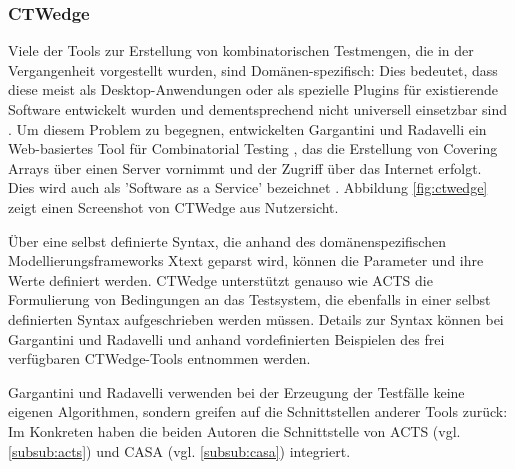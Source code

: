 \subsubsection{CTWedge}\label{subsub:ctwedge}

Viele der Tools zur Erstellung von kombinatorischen Testmengen, die in der Vergangenheit vorgestellt wurden, sind Domänen-spezifisch: Dies bedeutet, dass diese meist als Desktop-Anwendungen oder als spezielle Plugins für existierende Software entwickelt wurden und dementsprechend nicht universell einsetzbar sind \cite{gargantini2018migrating}. Um diesem Problem zu begegnen, entwickelten Gargantini und Radavelli \cite{gargantini2018migrating} ein Web-basiertes Tool für Combinatorial Testing \cite{ctwedge}, das die Erstellung von Covering Arrays über einen Server vornimmt und der Zugriff über das Internet erfolgt. Dies wird auch als 'Software as a Service' bezeichnet \cite{gargantini2018migrating}. Abbildung \ref{fig:ctwedge} zeigt einen Screenshot von CTWedge aus Nutzersicht.

Über eine selbst definierte Syntax, die anhand des domänenspezifischen Modellierungsframeworks Xtext \cite{eysholdt2010xtext} geparst wird, können die Parameter und ihre Werte definiert werden. CTWedge unterstützt genauso wie ACTS die Formulierung von Bedingungen an das Testsystem, die ebenfalls in einer selbst definierten Syntax aufgeschrieben werden müssen. Details zur Syntax können bei Gargantini und Radavelli \cite{gargantini2018migrating} und anhand vordefinierten Beispielen des frei verfügbaren CTWedge-Tools \cite{ctwedge} entnommen werden.

Gargantini und Radavelli verwenden bei der Erzeugung der Testfälle keine eigenen Algorithmen, sondern greifen auf die Schnittstellen anderer Tools zurück: Im Konkreten haben die beiden Autoren die Schnittstelle von ACTS (vgl. \autoref{subsub:acts}) und CASA (vgl. \autoref{subsub:casa}) integriert.










